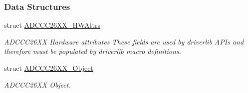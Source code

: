 \subsubsection*{Data Structures}
\begin{DoxyCompactItemize}
\item 
struct \hyperlink{struct_a_d_c_c_c26_x_x___h_w_attrs}{A\+D\+C\+C\+C26\+X\+X\+\_\+\+H\+W\+Attrs}
\begin{DoxyCompactList}\small\item\em A\+D\+C\+C\+C26\+X\+X Hardware attributes These fields are used by driverlib A\+P\+Is and therefore must be populated by driverlib macro definitions. \end{DoxyCompactList}\item 
struct \hyperlink{struct_a_d_c_c_c26_x_x___object}{A\+D\+C\+C\+C26\+X\+X\+\_\+\+Object}
\begin{DoxyCompactList}\small\item\em A\+D\+C\+C\+C26\+X\+X Object. \end{DoxyCompactList}\end{DoxyCompactItemize}
